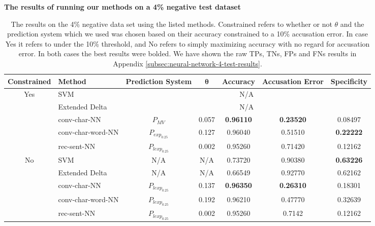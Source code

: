 \begin{table}[]
\centering
\textbf{The results of running our methods on a 4\% negative test dataset}\par\medskip
\begin{adjustbox}{center}
\scriptsize
\begin{tabular}{|c|l|c|c|c|c|c|}
\hline
    \textbf{Constrained} & \textbf{Method} & \textbf{Prediction System} & $\mathbf{\theta}$ & \textbf{Accuracy} & \textbf{Accusation Error} & \textbf{Specificity} \\ \hline
    \multirow{5}{*}{Yes} & \gls{SVM} & \multicolumn{5}{c|}{N/A} \\ \cline{2-7}
    & Extended Delta & \multicolumn{5}{c|}{N/A} \\ \cline{2-7}
    & \gls{conv-char-NN} & $P_{MV}$ & 0.057 & \textbf{0.96110} & \textbf{0.23520} & 0.08497 \\ \cline{2-7}
    & \gls{conv-char-word-NN} & $P_{exp_{0.25}}$ & 0.127 & 0.96040 & 0.51510 & \textbf{0.22222} \\ \cline{2-7}
    & \gls{rec-sent-NN} & $P_{lexp_{0.25}}$ & 0.002 & 0.95260 & 0.71420 & 0.12162 \\ \hline\hline
    \multirow{5}{*}{No} & \gls{SVM} & N/A & N/A & 0.73720 & 0.90380 & \textbf{0.63226} \\ \cline{2-7}
    & Extended Delta & N/A & N/A & 0.66549 & 0.92770 & 0.62162 \\ \cline{2-7}
    & \gls{conv-char-NN} & $P_{lexp_{0.25}}$ & 0.137 & \textbf{0.96350} & \textbf{0.26310} & 0.18301 \\ \cline{2-7}
    & \gls{conv-char-word-NN} & $P_{lexp_{0.25}}$ & 0.192 & 0.96210 & 0.47770 & 0.32639 \\ \cline{2-7}
    & \gls{rec-sent-NN} & $P_{lexp_{0.25}}$ & 0.002 & 0.95260 & 0.7142 & 0.12162 \\ \hline
\end{tabular}
\end{adjustbox}
\caption{The results on the 4\% negative data set using the listed methods.
Constrained refers to whether or not $\theta$ and the prediction system which we
used was chosen based on their accuracy constrained to a 10\% accusation error.
In case Yes it refers to under the 10\% threshold, and No refers to simply
maximizing accuracy with no regard for accusation error. In both cases
the best results were bolded. We have shown the raw \glspl{TP}, \glspl{TN},
\glspl{FP} and \glspl{FN} results in Appendix
\ref{subsec:neural-network-4-test-results}.}
\label{tab:04_results}
\end{table}
